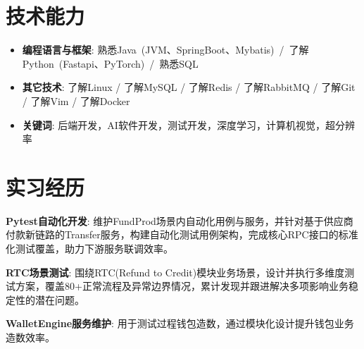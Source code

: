 \documentclass{resume}
\begin{document}
\section{技术能力}
\begin{itemize}[parsep=0.2ex]

  \item \textbf{编程语言与框架}: 熟悉Java~(JVM、SpringBoot、Mybatis)~/~了解Python~(Fastapi、PyTorch)~/~熟悉SQL~
  \vspace{0.1cm}
  \item \textbf{其它技术}: 了解Linux / 了解MySQL / 了解Redis / 了解RabbitMQ / 了解Git / 了解Vim / 了解Docker 
  \vspace{0.1cm}
  \item \textbf{关键词}: 后端开发，AI软件开发，测试开发，深度学习，计算机视觉，超分辨率

\end{itemize}

\section{实习经历}
  \vspace{0.1cm}
\begin{itemize}[parsep=0.2ex]
  {\small 
  \item \textbf{Pytest自动化开发}: 维护FundProd场景内自动化用例与服务，并针对基于供应商付款新链路的Transfer服务，构建自动化测试用例架构，完成核心RPC接口的标准化测试覆盖，助力下游服务联调效率。   
  \vspace{0.1cm}
  \item \textbf{RTC场景测试}: 围绕RTC(Refund to Credit)模块业务场景，设计并执行多维度测试方案，覆盖80+正常流程及异常边界情况，累计发现并跟进解决多项影响业务稳定性的潜在问题。}
  \vspace{0.1cm}
  \item \textbf{WalletEngine服务维护}: 用于测试过程钱包造数，通过模块化设计提升钱包业务造数效率。
\end{itemize}

\end{document}
